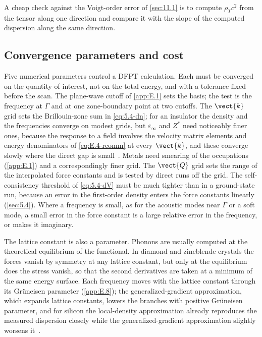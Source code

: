 A cheap check against the Voigt-order error of \cref{sec:11.1} is to compute $\rho_Tc^2$ from the tensor along one direction and compare it with the slope of the computed dispersion along the same direction.

\subsection{Convergence parameters and cost}

Five numerical parameters control a DFPT calculation. Each must be converged on the quantity of interest, not on the total energy, and with a tolerance fixed before the scan. The plane-wave cutoff of \cref{app:E.1} sets the basis; the test is the frequency at $\Gamma$ and at one zone-boundary point at two cutoffs. The $\vect{k}$ grid sets the Brillouin-zone sum in \cref{eq:5.4-dn}; for an insulator the density and the frequencies converge on modest grids, but $\varepsilon_\infty$ and $Z^*$ need noticeably finer ones, because the response to a field involves the velocity matrix elements and energy denominators of \cref{eq:E.4-rcomm} at every $\vect{k}$, and these converge slowly where the direct gap is small~\cite[Sect.~II.C.2]{baroni2001phonons}. Metals need smearing of the occupations (\cref{app:E.1}) and a correspondingly finer grid. The $\vect{Q}$ grid sets the range of the interpolated force constants and is tested by direct runs off the grid. The self-consistency threshold of \cref{eq:5.4-dV} must be much tighter than in a ground-state run, because an error in the first-order density enters the force constants linearly (\cref{sec:5.4}). Where a frequency is small, as for the acoustic modes near $\Gamma$ or a soft mode, a small error in the force constant is a large relative error in the frequency, or makes it imaginary.

The lattice constant is also a parameter. Phonons are usually computed at the theoretical equilibrium of the functional. In diamond and zincblende crystals the forces vanish by symmetry at any lattice constant, but only at the equilibrium does the stress vanish, so that the second derivatives are taken at a minimum of the same energy surface. Each frequency moves with the lattice constant through its Gr\"uneisen parameter (\cref{app:E.8}); the generalized-gradient approximation, which expands lattice constants, lowers the branches with positive Gr\"uneisen parameter, and for silicon the local-density approximation already reproduces the measured dispersion closely while the generalized-gradient approximation slightly worsens it~\cite[Sect.~V.A]{baroni2001phonons}.

